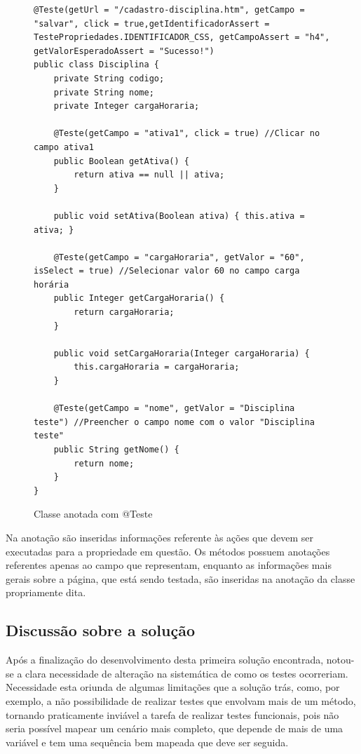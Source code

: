 \documentclass[tg]{mdtufsm}
\begin{document}
\begin{figure}[!htt]
\begin{lstlisting}
@Teste(getUrl = "/cadastro-disciplina.htm", getCampo = "salvar", click = true,getIdentificadorAssert = TestePropriedades.IDENTIFICADOR_CSS, getCampoAssert = "h4", getValorEsperadoAssert = "Sucesso!")
public class Disciplina {
    private String codigo;
    private String nome;
    private Integer cargaHoraria;

    @Teste(getCampo = "ativa1", click = true) //Clicar no campo ativa1
    public Boolean getAtiva() {
        return ativa == null || ativa;
    }

    public void setAtiva(Boolean ativa) { this.ativa = ativa; }

    @Teste(getCampo = "cargaHoraria", getValor = "60", isSelect = true) //Selecionar valor 60 no campo carga horária
    public Integer getCargaHoraria() {
        return cargaHoraria;
    }

    public void setCargaHoraria(Integer cargaHoraria) {
        this.cargaHoraria = cargaHoraria;
    }

    @Teste(getCampo = "nome", getValor = "Disciplina teste") //Preencher o campo nome com o valor "Disciplina teste"
    public String getNome() {
        return nome;
    }
}
\end{lstlisting}
	\caption{Classe anotada com @Teste}
	\label{code:Disciplina.java}
\end{figure}

Na anotação são inseridas informações referente às ações que devem ser executadas para a propriedade em questão. Os métodos possuem anotações referentes apenas ao campo que representam, enquanto as informações mais gerais sobre
a página, que está sendo testada, são inseridas na anotação da classe propriamente dita.

\subsection{Discussão sobre a solução}
Após a finalização do desenvolvimento desta primeira solução encontrada, notou-se a clara necessidade de alteração na sistemática de como os testes ocorreriam. Necessidade esta oriunda de algumas limitações que a solução trás,
como, por exemplo, a não possibilidade de realizar testes que envolvam mais de um método, tornando praticamente inviável a tarefa de realizar testes funcionais, pois não seria possível mapear um cenário mais completo, que depende
de mais de uma variável e tem uma sequência bem mapeada que deve ser seguida.
\end{document}
